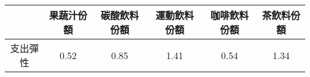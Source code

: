 \begin{tabular}{cccccc}
  \hline
 & 果蔬汁份額 & 碳酸飲料份額 & 運動飲料份額 & 咖啡飲料份額 & 茶飲料份額 \\ 
  \hline
支出彈性 & 0.52 & 0.85 & 1.41 & 0.54 & 1.34 \\ 
   \hline
\end{tabular}
